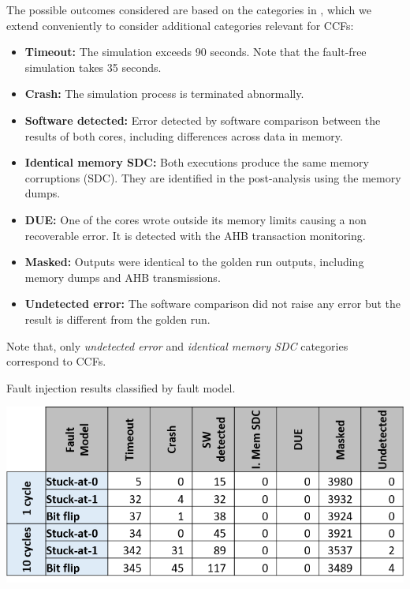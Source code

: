 The possible outcomes considered are based on the categories in \cite{FaultModel}, which we extend conveniently to consider additional categories relevant for CCFs:
\begin{itemize}
 \item \textbf{Timeout:}  The simulation exceeds 90 seconds. Note that the fault-free simulation takes 35 seconds.
 \item \textbf{Crash:}  The simulation process is terminated abnormally.
 \item \textbf{Software detected:} Error detected by software comparison between the results of both cores, including differences across data in memory.
 \item \textbf{Identical memory SDC:} Both executions produce the same memory corruptions (SDC). They are identified in the post-analysis using the memory dumps.
 \item \textbf{DUE:}  One of the cores wrote outside its memory limits causing a non recoverable error. It is detected with the AHB transaction monitoring.
 \item \textbf{Masked:}  Outputs were identical to the golden run outputs, including memory dumps and AHB transmissions. 
 \item \textbf{Undetected error:}  The software comparison did not raise any error but the result is different from the golden run.
\end{itemize}

Note that, only \emph{undetected error} and \emph{identical memory SDC} categories correspond to CCFs.

\begin{table}[t!]
  \caption{Fault injection results classified by fault model.}
  \label{fault_injection_results}
  \centering
  \includegraphics[width=1\columnwidth]{imgs/faultinjection2.png} 
  \end{table}

